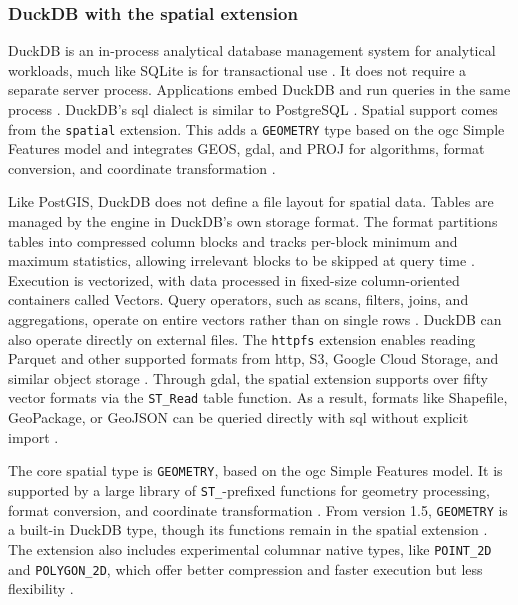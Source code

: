 \subsubsection{DuckDB with the spatial extension}
DuckDB is an in-process analytical database management system for analytical workloads, much like SQLite is for transactional use \parencite{raasveldt2019_duckdb_embeddable_analytical_database}. It does not require a separate server process. Applications embed DuckDB and run queries in the same process \parencite{raasveldt2019_duckdb_embeddable_analytical_database}. DuckDB's \acrshort{sql} dialect is similar to PostgreSQL \parencite{duckdb2025_sql_introduction}. Spatial support comes from the \texttt{spatial} extension. This adds a \texttt{GEOMETRY} type based on the \acrshort{ogc} Simple Features model and integrates GEOS, \acrshort{gdal}, and PROJ for algorithms, format conversion, and coordinate transformation \parencite{gabrielsson2023_postgeese_duckdb_spatial_extension, duckdb2025_spatial_extension_overview}.

Like PostGIS, DuckDB does not define a file layout for spatial data. Tables are managed by the engine in DuckDB's own storage format. The format partitions tables into compressed column blocks and tracks per-block minimum and maximum statistics, allowing irrelevant blocks to be skipped at query time \parencite{raasveldt2019_duckdb_embeddable_analytical_database}. Execution is vectorized, with data processed in fixed-size column-oriented containers called Vectors. Query operators, such as scans, filters, joins, and aggregations, operate on entire vectors rather than on single rows \parencite{duckdb2025_vector}. DuckDB can also operate directly on external files. The \texttt{httpfs} extension enables reading Parquet and other supported formats from \acrshort{http}, S3, Google Cloud Storage, and similar object storage \parencite{duckdb2025_documentation_httpfs}. Through \acrshort{gdal}, the spatial extension supports over fifty vector formats via the \texttt{ST\_Read} table function. As a result, formats like Shapefile, GeoPackage, or GeoJSON can be queried directly with \acrshort{sql} without explicit import \parencite{gabrielsson2023_postgeese_duckdb_spatial_extension}.

The core spatial type is \texttt{GEOMETRY}, based on the \acrshort{ogc} Simple Features model. It is supported by a large library of \texttt{ST\_}-prefixed functions for geometry processing, format conversion, and coordinate transformation \parencite{gabrielsson2023_postgeese_duckdb_spatial_extension, duckdb2025_spatial_extension_overview}. From version 1.5, \texttt{GEOMETRY} is a built-in DuckDB type, though its functions remain in the spatial extension \parencite{duckdb2025_spatial_extension_overview}. The extension also includes experimental columnar native types, like \texttt{POINT\_2D} and \texttt{POLYGON\_2D}, which offer better compression and faster execution but less flexibility \parencite{gabrielsson2023_postgeese_duckdb_spatial_extension, duckdb2025_spatial_extension_overview}.

